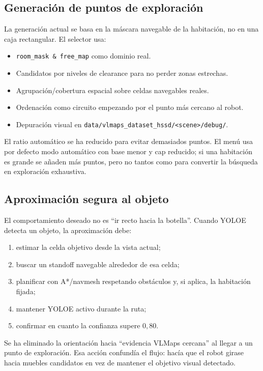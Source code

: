 \documentclass[11pt,a4paper]{article}
\begin{document}
\subsection{Generación de puntos de exploración}

La generación actual se basa en la máscara navegable de la habitación, no en una caja
rectangular. El selector usa:

\begin{itemize}
  \item \texttt{room\_mask \& free\_map} como dominio real.
  \item Candidatos por niveles de clearance para no perder zonas estrechas.
  \item Agrupación/cobertura espacial sobre celdas navegables reales.
  \item Ordenación como circuito empezando por el punto más cercano al robot.
  \item Depuración visual en \texttt{data/vlmaps\_dataset\_hssd/<scene>/debug/}.
\end{itemize}

El ratio automático se ha reducido para evitar demasiados puntos. El menú usa por defecto
modo automático con base menor y cap reducido; si una habitación es grande se añaden más
puntos, pero no tantos como para convertir la búsqueda en exploración exhaustiva.

\subsection{Aproximación segura al objeto}

El comportamiento deseado no es ``ir recto hacia la botella''. Cuando YOLOE detecta un
objeto, la aproximación debe:

\begin{enumerate}
  \item estimar la celda objetivo desde la vista actual;
  \item buscar un standoff navegable alrededor de esa celda;
  \item planificar con A*/navmesh respetando obstáculos y, si aplica, la habitación fijada;
  \item mantener YOLOE activo durante la ruta;
  \item confirmar en cuanto la confianza supere $0{,}80$.
\end{enumerate}

Se ha eliminado la orientación hacia ``evidencia VLMaps cercana'' al llegar a un punto de
exploración. Esa acción confundía el flujo: hacía que el robot girase hacia muebles
candidatos en vez de mantener el objetivo visual detectado.
\end{document}
